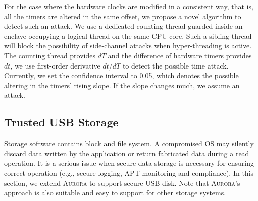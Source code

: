 For the case where the hardware clocks are modified in a consistent way, that is, all the timers are altered in the same offset, we propose a novel algorithm to detect such an attack. We use a dedicated counting thread \cite{DBLP:conf/dimva/SchwarzWGMM17} guarded inside an enclave occupying a logical thread on the same CPU core. Such a sibling thread will block the possibility of side-channel attacks when hyper-threading is active. The counting thread provides $dT$ and the difference of hardware timers provides $dt$, we use first-order derivative $dt/dT$ to detect the possible time attack. Currently, we set the confidence interval to 0.05, which denotes the possible altering in the timers' rising slope. If the slope changes much, we assume an attack.


\subsection{Trusted USB Storage}\label{storage_service}
Storage software contains block and file system. A compromised OS may silently discard data written by the application or return fabricated data during a read operation. It is a serious issue when secure data storage is  necessary for ensuring correct operation (e.g., secure logging, APT monitoring and compliance). In this section, we extend \textsc{Aurora} to support secure USB disk. Note that \textsc{Aurora}'s approach is also suitable and easy to support for other storage systems.

